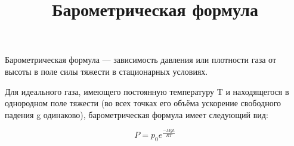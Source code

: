 \documentclass[12pt]{article}
\title{\bf Барометрическая формула}
\begin{document}
 
\maketitle 
Барометрическая формула — зависимость давления или плотности газа от высоты в поле силы тяжести в стационарных условиях.

Для идеального газа, имеющего постоянную температуру T и находящегося в однородном поле тяжести (во всех точках его объёма ускорение свободного падения g одинаково), барометрическая формула имеет следующий вид:
\newline 
\newline 
\begin{k} 
$$ P = p_0e^ \frac {-Mgh}{RT} $$
\end{k}
\end{document}

